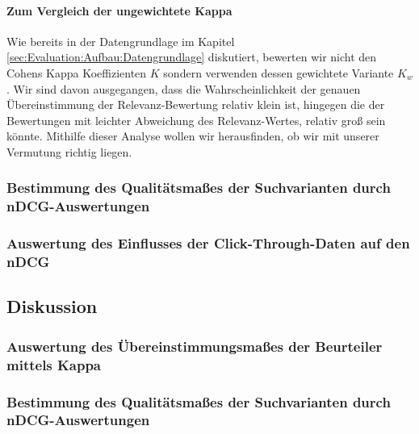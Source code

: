 

\paragraph{Zum Vergleich der ungewichtete Kappa}
Wie bereits in der Datengrundlage im Kapitel \ref{sec:Evaluation:Aufbau:Datengrundlage} diskutiert, bewerten wir nicht den Cohens Kappa Koeffizienten $K$ sondern verwenden dessen gewichtete Variante $K_w$. Wir sind davon ausgegangen, dass die Wahrscheinlichkeit der genauen Übereinstimmung der Relevanz-Bewertung relativ klein ist, hingegen die der Bewertungen mit leichter Abweichung des Relevanz-Wertes, relativ groß sein könnte. Mithilfe dieser Analyse wollen wir herausfinden, ob wir mit unserer Vermutung richtig liegen.



\subsubsection{Bestimmung des Qualitätsmaßes der Suchvarianten durch nDCG-Auswertungen}
\label{sec:Evaluation:Auswertung:QuantitativeAuswertung:nDCG}



\subsubsection{Auswertung des Einflusses der Click-Through-Daten auf den nDCG}
\label{sec:Evaluation:Auswertung:QuantitativeAuswertung:EinflussNDCG}


\subsection{Diskussion}
\label{sec:Evaluation:Auswertung:Diskussion}

\subsubsection{Auswertung des Übereinstimmungsmaßes der Beurteiler mittels Kappa}
\label{sec:Evaluation:Auswertung:Diskussion:Kappa}

\subsubsection{Bestimmung des Qualitätsmaßes der Suchvarianten durch nDCG-Auswertungen}
\label{sec:Evaluation:Auswertung:Diskussion:nDCG}


